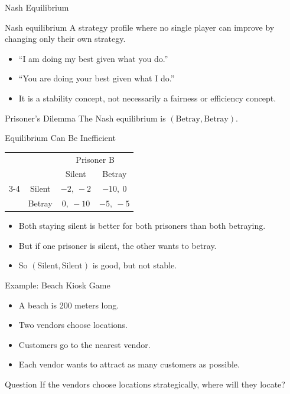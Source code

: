 \documentclass[10pt,aspectratio=169]{beamer}
\newcommand{\pay}[2]{#1,\ #2}
\begin{document}
\begin{frame}{Nash Equilibrium}
\begin{block}{Nash equilibrium}
A strategy profile where no single player can improve by changing only their own strategy.
\end{block}
\vspace{0.2cm}
\begin{itemize}
  \item ``I am doing my best given what you do.''
  \item ``You are doing your best given what I do.''
  \item It is a stability concept, not necessarily a fairness or efficiency concept.
\end{itemize}
\vspace{0.25cm}
\begin{block}{Prisoner's Dilemma}
The Nash equilibrium is $(\text{Betray}, \text{Betray})$.
\end{block}
\end{frame}

\begin{frame}{Equilibrium Can Be Inefficient}
\begin{center}
\begin{tabular}{c c c c}
 & & \multicolumn{2}{c}{Prisoner B}\\
 & & Silent & Betray\\
\cmidrule{3-4}
\multirow{2}{*}{Prisoner A} & Silent & $\pay{-2}{-2}$ & $\pay{-10}{0}$\\
 & Betray & $\pay{0}{-10}$ & $\pay{-5}{-5}$\\
\end{tabular}
\end{center}
\vspace{0.25cm}
\begin{itemize}
  \item Both staying silent is better for both prisoners than both betraying.
  \item But if one prisoner is silent, the other wants to betray.
  \item So $(\text{Silent},\text{Silent})$ is good, but not stable.
\end{itemize}
\end{frame}

\begin{frame}{Example: Beach Kiosk Game}
\begin{itemize}
  \item A beach is 200 meters long.
  \item Two vendors choose locations.
  \item Customers go to the nearest vendor.
  \item Each vendor wants to attract as many customers as possible.
\end{itemize}
\vspace{0.3cm}
\begin{block}{Question}
If the vendors choose locations strategically, where will they locate?
\end{block}
\end{frame}
\end{document}
